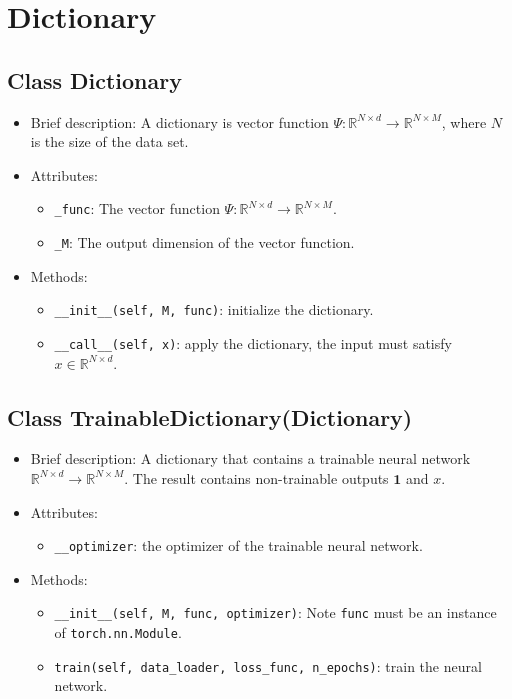 

\section{Dictionary}
\subsection{Class Dictionary}

\begin{itemize}
\item Brief description: A dictionary is vector function
  $\Psi: \mathbb{R}^{N \times d} \rightarrow
  \mathbb{R}^{N \times M}$,
  where $N$ is the size of the data set.
\item Attributes:
  \begin{itemize}
  \item \lstinline|_func|: The vector function $\Psi: \mathbb{R}^{N \times d} \rightarrow \mathbb{R}^{N \times M}$.
  \item \lstinline|_M|: The output dimension of the vector function.
  \end{itemize}
\item Methods:
  \begin{itemize}
  \item \lstinline|__init__(self, M, func)|: initialize the dictionary.
  \item \lstinline|__call__(self, x)|: apply the dictionary,
    the input must satisfy $x \in \mathbb{R}^{N \times d}$.
  \end{itemize}
\end{itemize}

\subsection{Class TrainableDictionary(Dictionary)}

\begin{itemize}
\item Brief description: A dictionary that contains a trainable neural network $\mathbb{R}^{N \times d} \rightarrow \mathbb{R}^{N \times M}$.
  The result contains non-trainable outputs $\mathbf{1}$ and $x$.
\item Attributes:
  \begin{itemize}
  \item \lstinline|__optimizer|: the optimizer of the trainable neural network.
  \end{itemize}
\item Methods:
  \begin{itemize}
  \item \lstinline|__init__(self, M, func, optimizer)|:
  Note \lstinline|func| must be an instance of \lstinline|torch.nn.Module|.
  \item \lstinline|train(self, data_loader, loss_func, n_epochs)|:
  train the neural network.
  \end{itemize}
\end{itemize}

